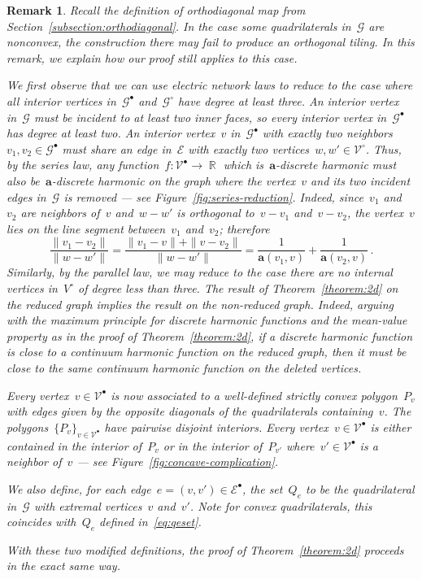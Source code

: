 \documentclass[12pt]{amsart}
\numberwithin{equation}{section}
\DeclareMathOperator{\R}{\mathbb{R}}
\newtheorem{remark}[theorem]{Remark}
\newcommand{\G}{\mathcal{G}}
\newcommand{\V}{\mathcal{V}}
\newcommand{\E}{\mathcal{E}}
\newcommand{\Qe}{\hyperref[eq:qeset]{Q_e}}
\begin{document}
\begin{remark}
\label{remark:orthodiagonalmaps}
Recall the definition of orthodiagonal map from Section~\ref{subsection:orthodiagonal}. In the case some quadrilaterals in~$\G$ are nonconvex, the construction there may fail 
to produce an orthogonal tiling. In this remark, we explain how our proof still applies to this case.

We first observe that we can use electric network laws to reduce to the case where all interior vertices in~$\G^{\bullet}$ and~$\G^{\circ}$ have degree at least three. An interior vertex in~$\G$ must be incident to at least two inner faces, so every interior vertex in~$\G^{\bullet}$ has degree at least two. An interior vertex~$v$ in~$\G^{\bullet}$ with exactly two neighbors~$v_1, v_2 \in \G^{\bullet}$ must share an edge in~$\E$ with exactly two vertices~$w, w' \in \V^{\circ}$. Thus, by the series law, any function~$f: \V^{\bullet} \to \R$ which is~$\mathbf{a}$-discrete harmonic must also be~$\mathbf{a}$-discrete harmonic on the graph where the vertex~$v$ and its two incident edges in~$\G$ is removed --- see Figure~\ref{fig:series-reduction}. Indeed, since~$v_1$ and~$v_2$ are neighbors of~$v$ and~$w-w'$ is orthogonal to~$v-v_1$ and~$v - v_2$, the vertex~$v$ lies on the line segment between~$v_1$ and~$v_2$; therefore
\[
\frac{\|v_1 - v_2\|}{\|w - w'\|} = \frac{\|v_1 - v\| + \|v - v_2\|}{\|w - w'\|}  = \frac{1}{\mathbf{a}(v_1, v)} + \frac{1}{\mathbf{a}(v_2, v)} \, . 
\]
Similarly, by the parallel law, we may reduce to the case there are no internal vertices in~$V^{\circ}$ of degree less than three. 
The result of Theorem~\ref{theorem:2d} on the reduced graph implies the result on the non-reduced graph. Indeed, arguing with the maximum principle for discrete harmonic functions and the mean-value property as in the proof of Theorem~\ref{theorem:2d}, if a discrete harmonic function is close to a continuum harmonic function on the reduced graph, then it must be close to the same continuum harmonic function on the deleted vertices.

Every vertex~$v \in \V^{\bullet}$ is now associated to a well-defined strictly convex polygon~$P_v$ with edges given by the opposite diagonals of the quadrilaterals
containing~$v$. The polygons~$\{P_v\}_{v \in \V^{\bullet}}$ have pairwise disjoint interiors. Every vertex~$v \in \V^{\bullet}$ 
is either contained in the interior of~$P_v$ or in the interior of~$P_{v'}$ where~$v' \in \V^{\bullet}$ is a neighbor of~$v$ --- see Figure~\ref{fig:concave-complication}.

We also define, for each edge~$e = (v,v') \in \mathcal{E}^{\bullet}$, the set~$Q_e$ to be the quadrilateral in~$\G$ with extremal vertices~$v$ and~$v'$. Note for convex quadrilaterals, this coincides with~$\Qe$ defined in~\eqref{eq:qeset}. 

With these two modified definitions, the proof of Theorem~\ref{theorem:2d} proceeds in the exact same way. 
\end{remark}
\end{document}
